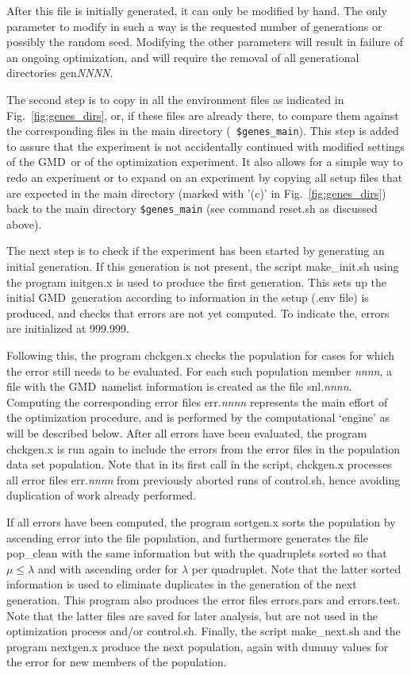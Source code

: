 \documentclass[12pt]{article}
\newcommand{\gmd}{GMD}
\newcommand{\file}{\sf}
\newcommand{\code}{\tt}
\begin{document}
\noindent
After this file is initially generated, it can only be modified by hand. The
only parameter to modify in such a way is the requested number of generations
or possibly the random seed. Modifying the other parameters will result in
failure of an ongoing optimization, and will require the removal of all
generational directories {\file gen{\it NNNN}}.

The second step is to copy in all the environment files as indicated in
Fig.~\ref{fig:genes_dirs}, or, if these files are already there, to compare
them against the corresponding files in the main directory ({\code
\$genes\_main}). This step is added to assure that the experiment is not
accidentally continued with modified settings of the \gmd\ or of the
optimization experiment. It also allows for a simple way to redo an experiment
or to expand on an experiment by copying all setup files that are expected in
the main directory (marked with '(c)' in Fig.~\ref{fig:genes_dirs}) back to
the main directory {\code \$genes\_main} (see command {\file reset.sh} as
discussed above).

The next step is to check if the experiment has been started by generating an
initial generation. If this generation is not present, the script {\file
make\_init.sh} using the program {\file initgen.x} is used to produce the
first generation. This sets up the initial \gmd\ generation according to
information in the setup ({\file *.env} file) is produced, and checks that
errors are not yet computed. To indicate the, errors are initialized at
999.999.

Following this, the program {\file chckgen.x} checks the population for cases
for which the error still needs to be evaluated. For each such population
member {\file \it nnnn}, a file with the \gmd\ namelist information is created
as the file {\file snl.{\it nnnn}}. Computing the corresponding error files
{\file err.{\it nnnn}} represents the main effort of the optimization
procedure, and is performed by the computational `engine' as will be described
below. After all errors have been evaluated, the program {\file chckgen.x} is
run again to include the errors from the error files in the population data
set {\file population}. Note that in its first call in the script, {\file
chckgen.x} processes all error files {\file err.{\it nnnn}} from previously
aborted runs of {\file control.sh}, hence avoiding duplication of work already
performed.

If all errors have been computed, the program {\file sortgen.x} sorts the
population by ascending error into the file {\file population}, and
furthermore generates the file {\file pop\_clean} with the same information
but with the quadruplets sorted so that $\mu \le \lambda$ and with ascending
order for $\lambda$ per quadruplet. Note that the latter sorted information is
used to eliminate duplicates in the generation of the next generation. This
program also produces the error files {\file errors.pars} and {\file
errors.test}.  Note that the latter files are saved for later analysis, but
are not used in the optimization process and/or {\file control.sh}.  Finally,
the script {\file make\_next.sh} and the program {\file nextgen.x} produce the
next population, again with dummy values for the error for new members of the
population.
\end{document}
